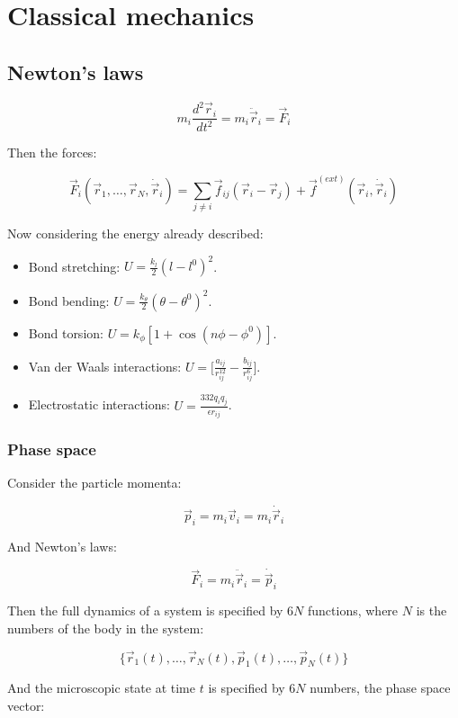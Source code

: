 \chapter{Classical mechanics}

\section{Newton's laws}

$$m_i\frac{d^2 \vec{r}_i}{dt^2} = m_i\ddot{\vec{r}}_i = \vec{F}_i$$

Then the forces:

$$\vec{F}_i(\vec{r}_1, \dots, \vec{r}_N, \dot{\vec{r}}_i) = \sum\limits_{j\neq i}\vec{f}_{ij}(\vec{r}_i-\vec{r}_j)+\vec{f}^{(ext)}(\vec{r}_i, \dot{\vec{r}}_i)$$

Now considering the energy already described:

\begin{multicols}{2}
	\begin{itemize}
		\item Bond stretching: $U = \frac{k_l}{2}(l-l^0)^2$.
		\item Bond bending: $U = \frac{k_\theta}{2}(\theta-\theta^0)^2$.
		\item Bond torsion: $U = k_\phi[1+\cos(n\phi-\phi^0)]$.
		\item Van der Waals interactions: $U = \biggl[\frac{a_{ij}}{r_{ij}^{12}}-\frac{b_{ij}}{r_{ij}^6}\biggr]$.
		\item Electrostatic interactions: $U = \frac{332q_iq_j}{\epsilon r_{ij}}$.
	\end{itemize}
\end{multicols}

	\subsection{Phase space}
	Consider the particle momenta:

	$$\vec{p}_i = m_i\vec{v}_i = m_i\dot{\vec{r}}_i$$

	And Newton's laws:

	$$\vec{F}_i = m_i\ddot{\vec{r}}_i = \dot{\vec{p}}_i$$

	Then the full dynamics of a system is specified by $6N$ functions, where $N$ is the numbers of the body in the system:

	$$\{\vec{r}_1(t), \dots, \vec{r}_N(t), \vec{p}_1(t), \dots, \vec{p}_N(t)\}$$

	And the microscopic state at time $t$ is specified by $6N$ numbers, the phase space vector:

